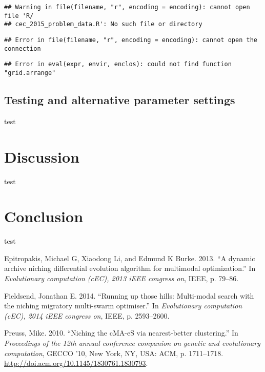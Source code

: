 \documentclass[12pt,a4paper]{article}
\begin{document}
\begin{verbatim}
## Warning in file(filename, "r", encoding = encoding): cannot open file 'R/
## cec_2015_problem_data.R': No such file or directory
\end{verbatim}

\begin{verbatim}
## Error in file(filename, "r", encoding = encoding): cannot open the connection
\end{verbatim}

\begin{verbatim}
## Error in eval(expr, envir, enclos): could not find function "grid.arrange"
\end{verbatim}

\subsection{Testing and alternative parameter
settings}\label{testing-and-alternative-parameter-settings}

test

\section{Discussion}\label{discussion}

test

\section{Conclusion}\label{conclusion}

test \newpage

\hypertarget{refs}{}
\hypertarget{ref-epitropakisux5f2013}{}
Epitropakis, Michael G, Xiaodong Li, and Edmund K Burke. 2013. ``A
dynamic archive niching differential evolution algorithm for multimodal
optimization.'' In \emph{Evolutionary computation (cEC), 2013 iEEE
congress on}, IEEE, p. 79--86.

\hypertarget{ref-fieldsendux5f2014}{}
Fieldsend, Jonathan E. 2014. ``Running up those hills: Multi-modal
search with the niching migratory multi-swarm optimiser.'' In
\emph{Evolutionary computation (cEC), 2014 iEEE congress on}, IEEE, p.
2593--2600.

\hypertarget{ref-preussux5f2010}{}
Preuss, Mike. 2010. ``Niching the cMA-eS via nearest-better
clustering.'' In \emph{Proceedings of the 12th annual conference
companion on genetic and evolutionary computation}, GECCO '10, New York,
NY, USA: ACM, p. 1711--1718.
\url{http://doi.acm.org/10.1145/1830761.1830793}.
\end{document}
